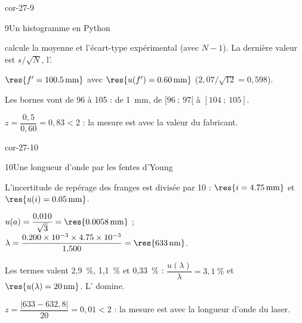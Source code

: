 \begin{blocLivre}{cor-27-9}
\begin{corrige}{9}{Un histogramme en Python}
\begin{questions}
\item {} calcule la moyenne et  l'écart-type expérimental (avec $N-1$). La dernière valeur est
$s/\sqrt N$, l'.
\item $\res{f'=\qty{100,5}{mm}}$ avec $\res{u(f')=\qty{0,60}{mm}}$ ($2{,}07/\sqrt{12}=0{,}598$).
\item Les bornes vont de 96 à 105 :  de \qty{1}{mm}, de $[96~;~97[$ à $[104~;~105]$.
\item $z=\dfrac{0{,}5}{0{,}60}=0{,}83<2$ : la mesure est  avec la valeur du fabricant.
\end{questions}
\end{corrige}
\end{blocLivre}
\begin{blocLivre}{cor-27-10}
\begin{corrige}{10}{Une longueur d'onde par les fentes d'Young}
\begin{questions}
\item L'incertitude de repérage des franges est divisée par 10 : $\res{i=\qty{4,75}{mm}}$ et $\res{u(i)=\qty{0,05}{mm}}$.
\item $u(a)=\dfrac{0{,}010}{\sqrt3}=\res{\qty{0,0058}{mm}}$ ; $\lambda=\dfrac{\num{0.200e-3}\times\num{4.75e-3}}{1{,}500}=\res{\qty{633}{nm}}$.
\item Les termes valent 2,9~\%, 1,1~\% et 0,33~\% : $\dfrac{u(\lambda)}{\lambda}=3{,}1~\%$ et $\res{u(\lambda)=\qty{20}{nm}}$. L'
domine.
\item $z=\dfrac{|633-632{,}8|}{20}=0{,}01<2$ : la mesure est  avec la longueur d'onde du laser.
\end{questions}
\end{corrige}
\end{blocLivre}
